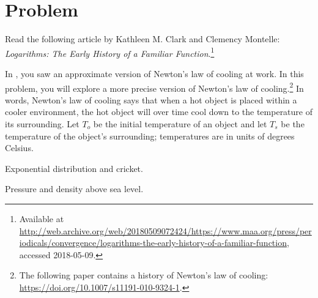 \documentclass[a4paper,oneside,12pt]{article}
\begin{document}
\newpage

\section*{Problem}

\begin{problem}
\item Read the following article by Kathleen M. Clark and Clemency
  Montelle:
  \emph{Logarithms: The Early History of a Familiar Function}.\footnote{
    Available at
    \url{http://web.archive.org/web/20180509072424/https://www.maa.org/press/periodicals/convergence/logarithms-the-early-history-of-a-familiar-function},
    accessed 2018-05-09.
  }

\item In , you saw an approximate
  version of Newton's law of cooling at work.  In this problem, you
  will explore a more precise version of Newton's law of
  cooling.\footnote{
    The following paper contains a history of Newton's law of cooling:
    \url{https://doi.org/10.1007/s11191-010-9324-1}.
  }
  In words, Newton's law of cooling says that when a hot object is
  placed within a cooler environment, the hot object will over time
  cool down to the temperature of its surrounding.  Let $T_o$ be the
  initial temperature of an object and let $T_s$ be the temperature of
  the object's surrounding; temperatures are in units of degrees
  Celsius.

\item Exponential distribution and cricket.

\item Pressure and density above sea level.
\end{problem}
\end{document}
